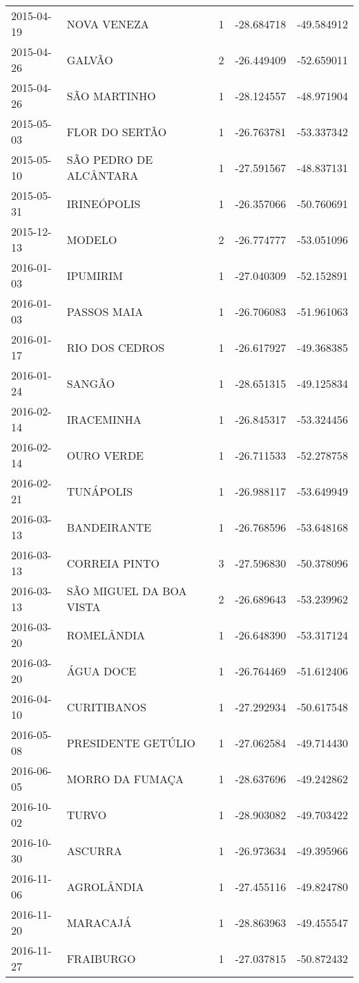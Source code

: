 \documentclass[
	12pt,				%
	openright,			%
	oneside,			%
	a4paper,			%
	english,			%
	french,				%
	spanish,			%
	brazil				%
	dvipsnames, table]{abntex2}
\begin{document}
\begin{longtable}[htbp]{llcrr}
2015-04-19 & NOVA VENEZA & 1 & -28.684718 & -49.584912 \\
2015-04-26 & GALVÃO & 2 & -26.449409 & -52.659011 \\
2015-04-26 & SÃO MARTINHO & 1 & -28.124557 & -48.971904 \\
2015-05-03 & FLOR DO SERTÃO & 1 & -26.763781 & -53.337342 \\
2015-05-10 & SÃO PEDRO DE ALCÂNTARA & 1 & -27.591567 & -48.837131 \\
2015-05-31 & IRINEÓPOLIS & 1 & -26.357066 & -50.760691 \\
2015-12-13 & MODELO & 2 & -26.774777 & -53.051096 \\
2016-01-03 & IPUMIRIM & 1 & -27.040309 & -52.152891 \\
2016-01-03 & PASSOS MAIA & 1 & -26.706083 & -51.961063 \\
2016-01-17 & RIO DOS CEDROS & 1 & -26.617927 & -49.368385 \\
2016-01-24 & SANGÃO & 1 & -28.651315 & -49.125834 \\
2016-02-14 & IRACEMINHA & 1 & -26.845317 & -53.324456 \\
2016-02-14 & OURO VERDE & 1 & -26.711533 & -52.278758 \\
2016-02-21 & TUNÁPOLIS & 1 & -26.988117 & -53.649949 \\
2016-03-13 & BANDEIRANTE & 1 & -26.768596 & -53.648168 \\
2016-03-13 & CORREIA PINTO & 3 & -27.596830 & -50.378096 \\
2016-03-13 & SÃO MIGUEL DA BOA VISTA & 2 & -26.689643 & -53.239962 \\
2016-03-20 & ROMELÂNDIA & 1 & -26.648390 & -53.317124 \\
2016-03-20 & ÁGUA DOCE & 1 & -26.764469 & -51.612406 \\
2016-04-10 & CURITIBANOS & 1 & -27.292934 & -50.617548 \\
2016-05-08 & PRESIDENTE GETÚLIO & 1 & -27.062584 & -49.714430 \\
2016-06-05 & MORRO DA FUMAÇA & 1 & -28.637696 & -49.242862 \\
2016-10-02 & TURVO & 1 & -28.903082 & -49.703422 \\
2016-10-30 & ASCURRA & 1 & -26.973634 & -49.395966 \\
2016-11-06 & AGROLÂNDIA & 1 & -27.455116 & -49.824780 \\
2016-11-20 & MARACAJÁ & 1 & -28.863963 & -49.455547 \\
2016-11-27 & FRAIBURGO & 1 & -27.037815 & -50.872432 \\

\end{longtable}
\end{document}
